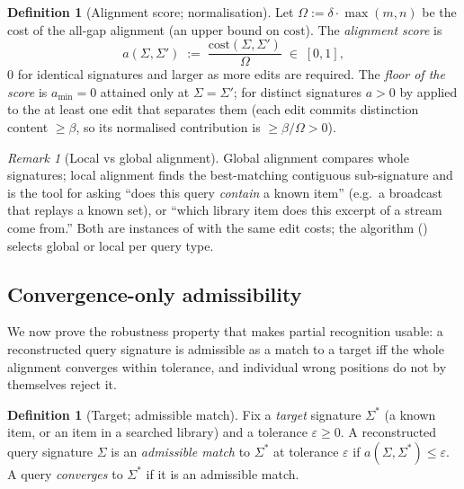 \documentclass[11pt,twocolumn,a4paper]{article}
\theoremstyle{thmstyle}
\theoremstyle{definition}
\newtheorem{definition}[theorem]{Definition}
\theoremstyle{remark}
\newtheorem{remark}[theorem]{Remark}
\newcommand{\flo}{\beta}
\newcommand{\sig}{\Sigma}
\newcommand{\algn}{a}
\newcommand{\Om}{\Omega}
\newcommand{\eps}{\varepsilon}
\begin{document}
\begin{definition}[Alignment score; normalisation]
\label{def:score}
Let $\Om:=\delta\cdot\max(m,n)$ be the cost of the all-gap alignment (an upper
bound on $\mathrm{cost}$). The \emph{alignment score} is
\[
\algn(\sig,\sig')\;:=\;\frac{\mathrm{cost}(\sig,\sig')}{\Om}\;\in\;[0,1],
\]
$0$ for identical signatures and larger as more edits are required. The
\emph{floor of the score} is $\algn_{\min}=0$ attained only at $\sig=\sig'$;
for distinct signatures $\algn>0$ by  applied to the at least
one edit that separates them (each edit commits distinction content $\ge\flo$,
so its normalised contribution is $\ge\flo/\Om>0$).
\end{definition}

\begin{remark}[Local vs global alignment]
\label{rem:local}
Global alignment \citep{needleman1970} compares whole signatures; local
alignment \citep{smith1981} finds the best-matching contiguous sub-signature and
is the tool for asking ``does this query \emph{contain} a known item'' (e.g.\ a
broadcast that replays a known set), or ``which library item does this excerpt of
a stream come from.'' Both are instances of  with the same
edit costs; the algorithm () selects global or local per
query type.
\end{remark}

\subsection{Convergence-only admissibility}

We now prove the robustness property that makes partial recognition usable: a
reconstructed query signature is admissible as a match to a target iff the whole
alignment converges within tolerance, and individual wrong positions do not by
themselves reject it.

\begin{definition}[Target; admissible match]
\label{def:admissible}
Fix a \emph{target} signature $\sig^{\ast}$ (a known item, or an item in a
searched library) and a tolerance $\eps\ge0$. A reconstructed query signature
$\sig$ is an \emph{admissible match} to $\sig^{\ast}$ at tolerance $\eps$ if
$\algn(\sig,\sig^{\ast})\le\eps$. A query \emph{converges} to $\sig^{\ast}$ if
it is an admissible match.
\end{definition}
\end{document}
